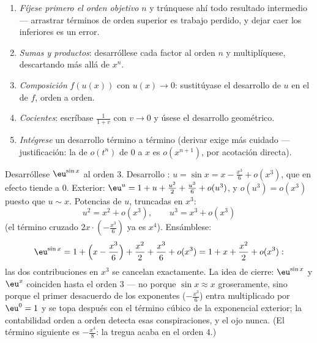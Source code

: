 \begin{method}\label{met:b1:taylor:compute}
\begin{enumerate}
  \item \emph{Fíjese primero el orden objetivo} $n$ y trúnquese ahí
        todo resultado intermedio --- arrastrar términos de orden
        superior es trabajo perdido, y dejar caer los inferiores es
        un error.
  \item \emph{Sumas y productos}: desarróllese cada factor al orden
        $n$ y multiplíquese, descartando más allá de $x^n$.
  \item \emph{Composición} $f(u(x))$ con $u(x) \to 0$: sustitúyase el
        desarrollo de $u$ en el de $f$, orden a orden.
  \item \emph{Cocientes}: escríbase $\frac{1}{1 + v}$ con $v \to 0$ y
        úsese el desarrollo geométrico.
  \item \emph{Intégrese} un desarrollo término a término (derivar
        exige más cuidado --- justificación: la  de $o(t^n)$
        de $0$ a $x$ es $o(x^{n+1})$, por acotación directa).
\end{enumerate}
\end{method}

\begin{example}\label{ex:b1:taylor:esin}
Desarróllese $\eu^{\sin x}$ al orden $3$. Desarrollo :
$u = \sin x = x - \frac{x^3}{6} + o(x^3)$, que en efecto tiende a
$0$. Exterior: $\eu^u = 1 + u + \frac{u^2}{2} + \frac{u^3}{6} +
o(u^3)$, y $o(u^3) = o(x^3)$ puesto que $u \sim x$. Potencias de $u$,
truncadas en $x^3$:
\[
u^2 = x^2 + o(x^3), \qquad u^3 = x^3 + o(x^3)
\]
(el término cruzado $2x\cdot(-\frac{x^3}{6})$ ya es $x^4$).
Ensámblese:
\[
\eu^{\sin x} = 1 + \Bigl(x - \frac{x^3}{6}\Bigr) + \frac{x^2}{2}
+ \frac{x^3}{6} + o(x^3)
= 1 + x + \frac{x^2}{2} + o(x^3) :
\]
las dos contribuciones en $x^3$ se cancelan exactamente. La idea de
cierre: $\eu^{\sin x}$ y $\eu^x$ coinciden hasta el orden $3$ --- no
porque $\sin x \approx x$ groseramente, sino porque el primer
desacuerdo de los exponentes ($-\frac{x^3}{6}$) entra multiplicado
por $\eu^0 = 1$ y se topa después con el término cúbico de la
exponencial exterior; la contabilidad orden a orden detecta esas
conspiraciones, y el ojo nunca. (El término siguiente es
$-\frac{x^4}{8}$: la tregua acaba en el orden $4$.)
\end{example}

